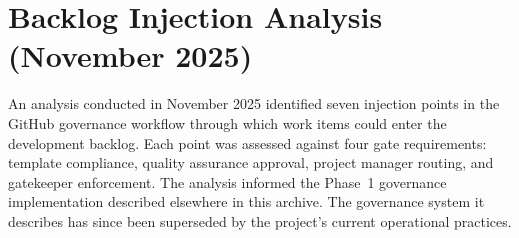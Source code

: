 
\section*{Backlog Injection Analysis (November 2025)}

An analysis conducted in November 2025 identified seven injection points in
the GitHub governance workflow through which work items could enter the
development backlog. Each point was assessed against four gate requirements:
template compliance, quality assurance approval, project manager routing, and
gatekeeper enforcement. The analysis informed the Phase~1 governance
implementation described elsewhere in this archive. The governance system it
describes has since been superseded by the project's current operational
practices.
